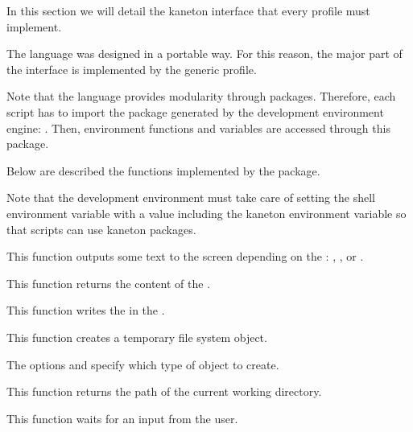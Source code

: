 

In this section we will detail the kaneton  interface that
every  profile must implement.

The  language was designed in a portable way. For this
reason, the major part of the  interface is implemented
by the  generic profile.

Note that the  language provides modularity through packages.
Therefore, each  script has to import the  package
generated by the development environment engine: .
Then, environment functions and variables are accessed through this package.

Below are described the functions implemented by the  package.

Note that the  development environment must take care of
setting the  shell environment variable with a value
including the  kaneton environment variable
so that scripts can use kaneton  packages.

         {
	   This function outputs some text to the screen depending on the
	   : , ,
	    or .
	 }

         {
	   This function returns the content of the .
	 }

         {
	   This function writes the  in the .
	 }

         {
	   This function creates a temporary file system object.

	   \-

	   The options  and 
	   specify which type of object to create.
	 }

         {
	   This function returns the path of the current working directory.
	 }

         {
	   This function waits for an input from the user.
	 }

